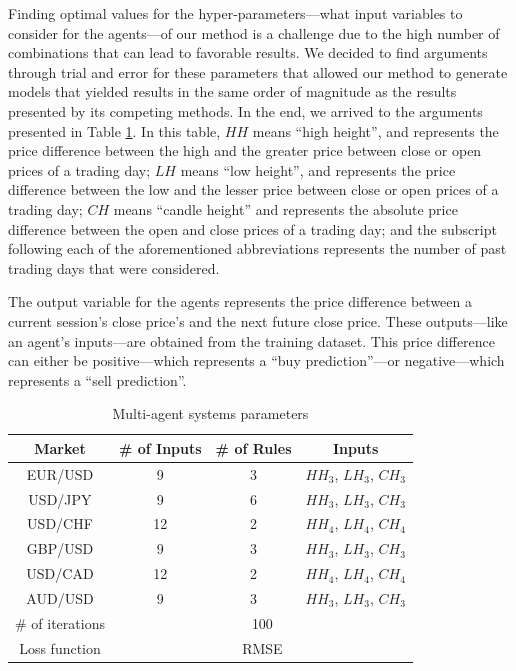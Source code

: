 \documentclass{ieeeaccess}
\begin{document}
Finding optimal values for the hyper-parameters---what input variables to consider for the agents---of our method is a
challenge due to the high number of combinations that can lead to
favorable results. We decided to find arguments through trial and error for these
parameters that allowed our method to generate models that yielded
results in the same order of magnitude as the results presented by its
competing methods. In the end, we arrived to the arguments
presented in Table \ref{agents-parameters}. In this table, 
$HH$ means ``high height'', and represents
the price difference between the high and the greater price between
close or open prices of a trading day; $LH$ means ``low height'', and
represents the price difference between the low and the lesser price
between close or open prices of a trading day; $CH$ means ``candle
height'' and represents the absolute price difference between the open
and close prices of a trading day; and the subscript following each of
the aforementioned abbreviations represents the number of past trading
days that were considered.

The output variable for the agents represents the price difference
\cite{granger1980introduction} between a current session's close
price's and the next future close price. These outputs---like an
agent's inputs---are obtained from the training dataset. This price
difference can either be positive---which represents a ``buy
prediction''---or negative---which represents a ``sell prediction''.


\begin{table}[]
  \caption{Multi-agent systems parameters}
  \small
  \centering
  \begin{tabular}{cccc}
    \textbf{Market} & \textbf{\# of Inputs} & \textbf{\# of Rules} & \textbf{Inputs} \\
    \hline
    EUR/USD & 9 & 3 & $HH_3$, $LH_3$, $CH_3$ \\
    USD/JPY & 9 & 6 & $HH_3$, $LH_3$, $CH_3$ \\
    USD/CHF & 12 & 2 & $HH_4$, $LH_4$, $CH_4$ \\
    GBP/USD & 9 & 3 & $HH_3$, $LH_3$, $CH_3$ \\
    USD/CAD & 12 & 2 & $HH_4$, $LH_4$, $CH_4$ \\
    AUD/USD & 9 & 3 & $HH_3$, $LH_3$, $CH_3$ \\
    \hline
    \hline
    \# of iterations & \multicolumn{3}{c}{100} \\
    Loss function & \multicolumn{3}{c}{RMSE} \\
    \hline
  \end{tabular}
  \label{agents-parameters}
\end{table}
\end{document}
